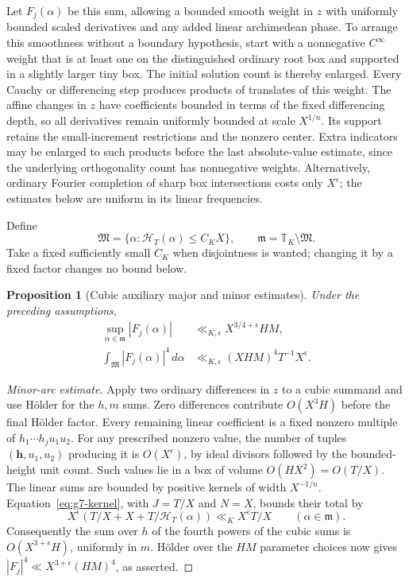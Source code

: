 \documentclass[11pt,reqno]{amsart}
\numberwithin{equation}{section}
\newtheorem{proposition}[theorem]{Proposition}
\theoremstyle{definition}
\begin{document}
Let $F_j(\alpha)$ be this sum, allowing a bounded smooth weight in $z$ with
uniformly bounded scaled derivatives and any added linear archimedean phase.
To arrange this smoothness without a boundary hypothesis, start with a
nonnegative $C^\infty$ weight that is at least one on the distinguished
ordinary root box and supported in a slightly larger tiny box.  The initial
solution count is thereby enlarged.  Every Cauchy or differencing step
produces products of translates of this weight.  The affine changes in $z$
have coefficients bounded in terms of the fixed differencing depth, so
all derivatives remain uniformly bounded at scale $X^{1/n}$.  Its support
retains the small-increment restrictions and the nonzero center.  Extra
indicators may be enlarged to such products before the last absolute-value
estimate, since the underlying orthogonality count has nonnegative weights.
Alternatively, ordinary Fourier completion of sharp box intersections costs
only $X^\epsilon$; the estimates below are uniform in its linear frequencies.

Define
\[
 \mathfrak M=\{\alpha:\mathcal H_T(\alpha)\le C_KX\},\qquad
 \mathfrak m=\mathbb T_K\setminus\mathfrak M.
\]
Take a fixed sufficiently small $C_K$ when disjointness is wanted; changing
it by a fixed factor changes no bound below.

\begin{proposition}[Cubic auxiliary major and minor estimates]
\label{prop:g7-cubic}
Under the preceding assumptions,
\begin{align}
 \sup_{\alpha\in\mathfrak m}|F_j(\alpha)|
       &\ll_{K,\epsilon}X^{3/4+\epsilon}HM,
       \label{eq:g7-cubic-minor}\\
 \int_{\mathfrak M}|F_j(\alpha)|^4\,d\alpha
       &\ll_{K,\epsilon}(XHM)^4T^{-1}X^\epsilon.
       \label{eq:g7-cubic-major}
\end{align}
\end{proposition}

\begin{proof}[Minor-arc estimate]
Apply two ordinary differences in $z$ to a cubic summand and use H\"older
for the $h,m$ sums.  Zero differences contribute $O(X^3H)$ before the final
H\"older factor.  Every remaining linear coefficient is a fixed nonzero
multiple of $h_1\cdots h_j u_1u_2$.  For any prescribed nonzero value,
the number of tuples $(\mathbf h,u_1,u_2)$ producing it is $O(X^\epsilon)$,
by ideal divisors followed by the bounded-height unit count.  Such values
lie in a box of volume $O(HX^2)=O(T/X)$.
The linear sums are bounded by positive kernels of width $X^{-1/n}$.
Equation~\eqref{eq:g7-kernel}, with $J=T/X$ and $N=X$, bounds their total by
\[
 X^\epsilon\left(T/X+X+T/\mathcal H_T(\alpha)\right)
       \ll_K X^\epsilon T/X
 \qquad(\alpha\in\mathfrak m).
\]
Consequently the sum over $h$ of the fourth powers of the cubic sums is
$O(X^{3+\epsilon}H)$, uniformly in $m$.  H\"older over the $HM$ parameter
choices now gives $|F_j|^4\ll X^{3+\epsilon}(HM)^4$, as asserted.
\end{proof}
\end{document}
